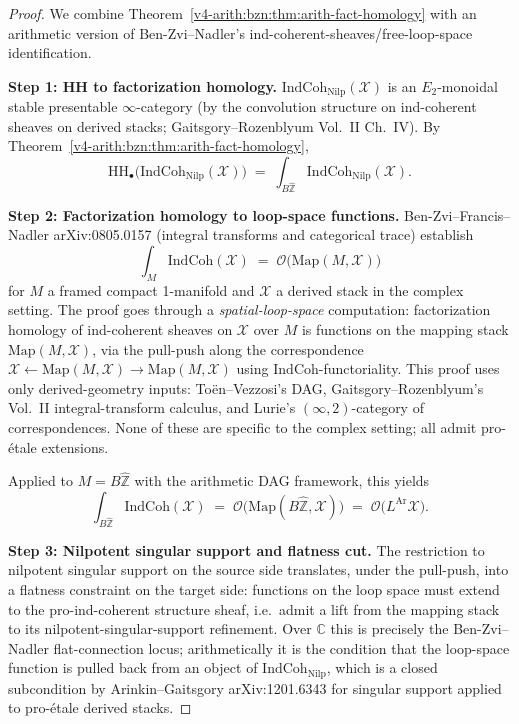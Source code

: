 \begin{proof}
We combine Theorem~\ref{v4-arith:bzn:thm:arith-fact-homology} with an
arithmetic version of Ben-Zvi--Nadler's
ind-coherent-sheaves/free-loop-space identification.

\medskip\noindent\textbf{Step 1: HH to factorization homology.}
\(\mathrm{IndCoh}_{\mathrm{Nilp}}(\mathcal{X})\) is an \(E_{2}\)-monoidal
stable presentable \(\infty\)-category (by the convolution structure
on ind-coherent sheaves on derived stacks; Gaitsgory--Rozenblyum
Vol.~II Ch.~IV). By Theorem~\ref{v4-arith:bzn:thm:arith-fact-homology},
\begin{equation}
\mathrm{HH}_{\bullet}\bigl(\mathrm{IndCoh}_{\mathrm{Nilp}}(\mathcal{X})\bigr)\;=\;\int_{B\widehat{\mathbb{Z}}}\mathrm{IndCoh}_{\mathrm{Nilp}}(\mathcal{X}).
\end{equation}

\medskip\noindent\textbf{Step 2: Factorization homology to loop-space
functions.} Ben-Zvi--Francis--Nadler arXiv:0805.0157 (integral
transforms and categorical trace) establish
\begin{equation}
\int_{M}\mathrm{IndCoh}(\mathcal{X})\;=\;\mathcal{O}\bigl(\mathrm{Map}(M,\mathcal{X})\bigr)
\end{equation}
for \(M\) a framed compact 1-manifold and \(\mathcal{X}\) a derived
stack in the complex setting. The proof goes through a
\emph{spatial-loop-space} computation: factorization homology of
ind-coherent sheaves on \(\mathcal{X}\) over \(M\) is functions on
the mapping stack \(\mathrm{Map}(M,\mathcal{X})\), via the pull-push
along the correspondence \(\mathcal{X}\leftarrow\mathrm{Map}(M,\mathcal{X})\to\mathrm{Map}(M,\mathcal{X})\)
using \(\mathrm{IndCoh}\)-functoriality. This proof uses only
derived-geometry inputs: To\"en--Vezzosi's DAG, Gaitsgory--Rozenblyum's
Vol.~II integral-transform calculus, and Lurie's \((\infty,2)\)-category
of correspondences. None of these are specific to the complex
setting; all admit pro-\'etale extensions.

Applied to \(M=B\widehat{\mathbb{Z}}\) with the arithmetic DAG
framework, this yields
\begin{equation}
\int_{B\widehat{\mathbb{Z}}}\mathrm{IndCoh}(\mathcal{X})\;=\;\mathcal{O}\bigl(\mathrm{Map}(B\widehat{\mathbb{Z}},\mathcal{X})\bigr)\;=\;\mathcal{O}\bigl(L^{\mathrm{Ar}}\mathcal{X}\bigr).
\end{equation}

\medskip\noindent\textbf{Step 3: Nilpotent singular support and flatness
cut.} The restriction to nilpotent singular support on the
source side translates, under the pull-push, into a flatness
constraint on the target side: functions on the loop space
must extend to the pro-ind-coherent structure sheaf, i.e.\
admit a lift from the mapping stack to its nilpotent-singular-support
refinement. Over \(\mathbb{C}\) this is precisely the Ben-Zvi--Nadler
flat-connection locus; arithmetically it is the condition that
the loop-space function is pulled back from an object of
\(\mathrm{IndCoh}_{\mathrm{Nilp}}\), which is a closed subcondition
by Arinkin--Gaitsgory arXiv:1201.6343 for singular support applied
to pro-\'etale derived stacks.


\end{proof}
